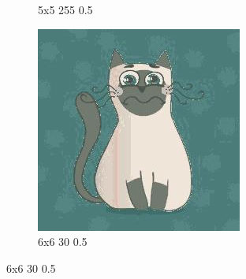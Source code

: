 \documentclass[12pt,a4paper]{article}
\begin{document}
\begin{figure}[htb]
\begin{subfigure}{0.25\textwidth}
  \caption{5x5 255 0.5}
  \label{fig:5}
\end{subfigure}
\begin{subfigure}{0.25\textwidth}
  \includegraphics[width=\linewidth]{images/cartoon/6-6-30-05}
  \caption{6x6 30 0.5}
  \label{fig:6}
\end{subfigure}\hfil %


\end{figure}
\end{document}
